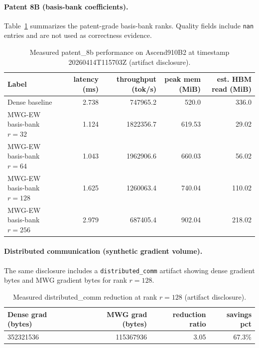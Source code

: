 \documentclass[11pt]{article}
\begin{document}
\paragraph{Patent 8B (basis-bank coefficients).}
Table~\ref{tab:patent8b_bench} summarizes the patent-grade basis-bank ranks. Quality fields include \texttt{nan} entries and are not used as correctness evidence.

\begin{table}[t]
\centering
\caption{Measured patent\_8b performance on Ascend910B2 at timestamp 20260414T115703Z (artifact disclosure).}
\label{tab:patent8b_bench}
\begin{tabular}{@{}lrrrr@{}}
\toprule
Label & latency (ms) & throughput (tok/s) & peak mem (MiB) & est. HBM read (MiB) \\
\midrule
Dense baseline & 2.738 & 747965.2 & 520.0 & 336.0 \\
MWG-EW basis-bank $r=32$ & 1.124 & 1822356.7 & 619.53 & 29.02 \\
MWG-EW basis-bank $r=64$ & 1.043 & 1962906.6 & 660.03 & 56.02 \\
MWG-EW basis-bank $r=128$ & 1.625 & 1260063.4 & 740.04 & 110.02 \\
MWG-EW basis-bank $r=256$ & 2.979 & 687405.4 & 902.04 & 218.02 \\
\bottomrule
\end{tabular}
\end{table}

\paragraph{Distributed communication (synthetic gradient volume).}
The same disclosure includes a \texttt{distributed\_comm} artifact showing dense gradient bytes and MWG gradient bytes for rank $r=128$.

\begin{table}[t]
\centering
\caption{Measured distributed\_comm reduction at rank $r=128$ (artifact disclosure).}
\label{tab:distributed_comm}
\begin{tabular}{@{}lrrr@{}}
\toprule
Dense grad (bytes) & MWG grad (bytes) & reduction ratio & savings pct \\
\midrule
352321536 & 115367936 & 3.05 & 67.3\% \\
\bottomrule
\end{tabular}
\end{table}
\end{document}

